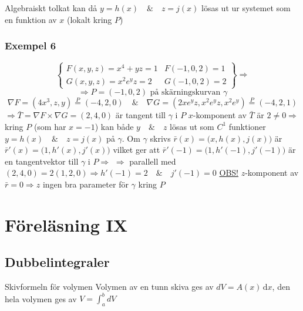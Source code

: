 \documentclass{article}
\begin{document}
Algebraiskt tolkat kan då \(y = h(x) \quad\&\quad z = j(x)\) lösas ut ur systemet som en funktion av \(x\) (lokalt kring \(P\))

\subsubsection{Exempel 6} 
\begin{equation}\label{eq:8.8}
	\begin{Bmatrix}
		F(x,y,z) = x^4 + yz = 1 & F(-1,0,2) = 1 \\
		G(x,y,z) = x^2e^yz = 2 & G(-1,0,2) = 2
	\end{Bmatrix} \Rightarrow
\end{equation}
\[\Rightarrow P = (-1,0,2) \text{ på skärningskurvan } \gamma\]
\[\nabla F = (4x^3,z,y) \overset{P}{=} (-4,2,0) \quad\&\quad \nabla G = (2xe^yz,x^2e^yz,x^2e^y) \overset{P}{=} (-4,2,1)\]
\(\Rightarrow \bar{T} = \nabla F \times \nabla G = (2,4,0)\) är tangent till \(\gamma\) i \(P\) \newline
\(x\)-komponent av \(\bar{T}\) är \(2 \neq 0 \Rightarrow\) kring \(P\) (som har \(x = -1\)) kan både \(y \quad\&\quad z\) lösas ut som \(C^1\) funktioner \(y = h(x) \quad\&\quad z = j(x)\) på \(\gamma\). \newline
Om \(\gamma\) skrivs \(\bar{r}(x) = \Big(x,h(x),j(x)\Big)\) är \(\bar{r}'(x) = \Big(1,h'(x),j'(x)\Big)\) vilket ger att \(\bar{r}'(-1) = \Big(1,h'(-1),j'(-1)\Big)\) är en tangentvektor till \(\gamma\) i \(P \Rightarrow\) \newline
\(\Rightarrow\) parallell med \((2,4,0) = 2(1,2,0) \Rightarrow h'(-1) = 2 \quad\&\quad j'(-1) = 0\) \newline
\underline{OBS!} \(z\)-komponent av \(\bar{r} = 0 \Rightarrow z\) ingen bra parameter för \(\gamma\) kring \(P\)







\section{Föreläsning IX}
\subsection{Dubbelintegraler}
Skivformeln för volymen \newline
Volymen av en tunn skiva ges av $dV = A(x)\,\mathrm{d}x$, den hela volymen ges av $V = \int_a^b dV$
\end{document}
